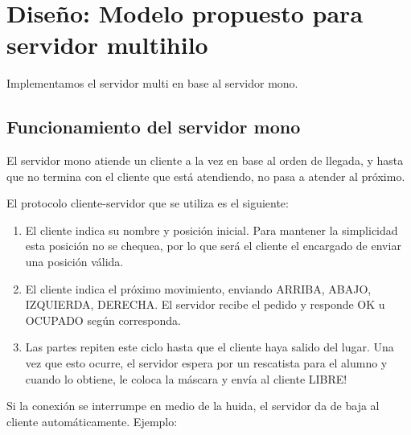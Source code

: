 \section{Dise\~no: Modelo propuesto para servidor multihilo}

Implementamos el servidor multi en base al servidor mono.

\subsection{Funcionamiento del servidor mono}
El servidor mono atiende un cliente a la vez en base al orden de llegada, y hasta que no termina con el cliente que est\'a atendiendo, no pasa a atender al pr\'oximo.

El protocolo cliente-servidor que se utiliza es el siguiente:
\begin{enumerate}
\item El cliente indica su nombre y posici\'on inicial. Para mantener la simplicidad esta posici\'on no se chequea, por lo que ser\'a el cliente el encargado de enviar una posici\'on v\'alida.
\item El cliente indica el pr\'oximo movimiento, enviando ARRIBA, ABAJO, IZQUIERDA, DERECHA. El servidor recibe el pedido y responde OK u OCUPADO seg\'un corresponda.
\item Las partes repiten este ciclo hasta que el cliente haya salido del lugar. Una vez que esto ocurre, el servidor espera por un rescatista para el alumno y cuando lo obtiene, le coloca la m\'ascara y env\'ia al cliente LIBRE!
\end{enumerate}

Si la conexi\'on se interrumpe en medio de la huida, el servidor da de baja al cliente autom\'aticamente.
Ejemplo:

